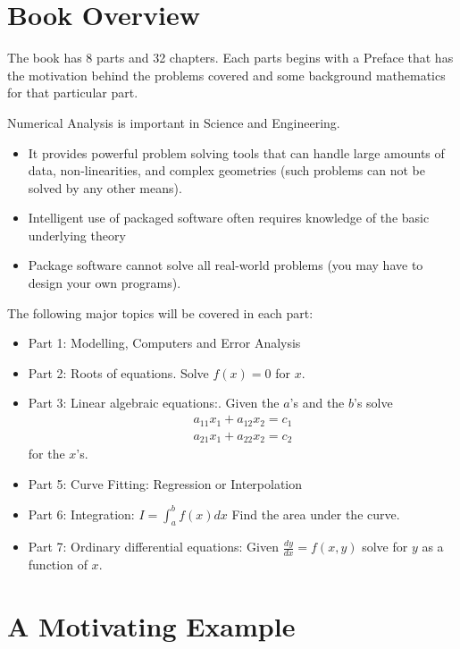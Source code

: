 \documentclass [titlepage,12pt,letter] {article}
\begin{document}
\section{Book Overview} 

The book has 8 parts and 32 chapters. Each parts begins with a Preface
that has the motivation behind the problems covered and some
background mathematics for that particular part. 


Numerical Analysis is important in Science and Engineering. 

\begin{itemize} 
\item{It provides powerful problem solving tools that can handle large
     amounts of data, non-linearities, and complex geometries (such
     problems can not be solved by any other means).}
\item{Intelligent use of packaged software often requires knowledge of
    the basic underlying theory} 
\item{Package software cannot solve all real-world problems (you may
    have to design your own programs).} 
\end{itemize} 

The following major topics will be covered in each part: 

\begin{itemize} 

\item{Part 1: Modelling, Computers and Error Analysis}
\item{Part 2: Roots of equations. Solve $f(x) = 0$ for $x$.}
\item{Part 3: Linear algebraic equations:. Given the $a$'s and the
    $b$'s solve 
\begin{eqnarray}
a_{11}x_{1} + a_{12} x_{2} = c_{1} \\ 
a_{21}x_{1} + a_{22} x_{2} = c_{2} 
\end{eqnarray} 
\noindent 
for the $x$'s. }
\item{Part 5: Curve Fitting: Regression or Interpolation}
\item{Part 6: Integration: $I = \int_{a}^{b} f(x) dx$ Find the area
    under the curve.}
\item{Part 7: Ordinary differential equations: Given $\frac{dy}{dx}=f(x,y)$ solve for $y$ as a function of $x$.}
\end{itemize} 


\section{A Motivating Example} 
\end{document}
